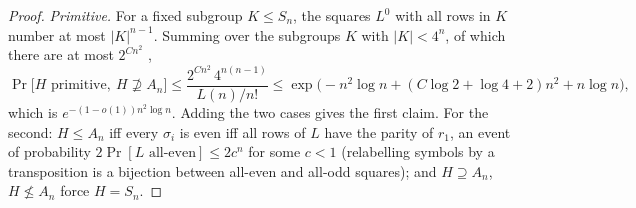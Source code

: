 \begin{proof}
\emph{Primitive.}  For a fixed subgroup $K\le S_n$, the squares $L^0$
with all rows in $K$ number at most $|K|^{n-1}$.  Summing over the
subgroups $K$ with $|K|<4^n$, of which there are at most $2^{Cn^2}$
\cite{Pyb93},
\[
\Pr\bigl[H\text{ primitive},\ H\not\supseteq A_n\bigr]
\le\frac{2^{Cn^2}\,4^{n(n-1)}}{L(n)/n!}
\le\exp\bigl(-n^2\log n+(C\log2+\log4+2)n^2+n\log n\bigr),
\]
which is $e^{-(1-o(1))n^2\log n}$.  Adding the two cases gives the
first claim.  For the second: $H\le A_n$ iff every $\sigma_i$ is even
iff all rows of $L$ have the parity of $r_1$, an event of probability
$2\Pr[L\text{ all-even}]\le2c^n$ for some $c<1$ \cite{HJ96}
(relabelling symbols by a transposition is a bijection between
all-even and all-odd squares); and $H\supseteq A_n$, $H\not\le A_n$
force $H=S_n$.
\end{proof}

